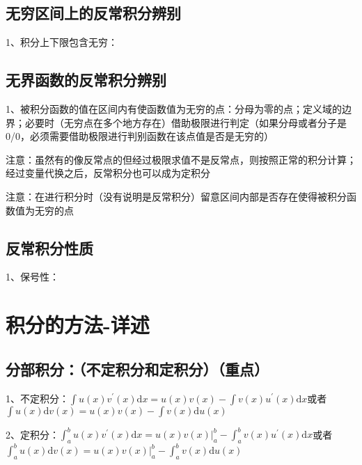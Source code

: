 \subsection{无穷区间上的反常积分辨别}

1、积分上下限包含无穷：



\subsection{无界函数的反常积分辨别}

1、被积分函数的值在区间内有使函数值为无穷的点：分母为零的点；定义域的边界；必要时（无穷点在多个地方存在）借助极限进行判定（如果分母或者分子是0/0，必须需要借助极限进行判别函数在该点值是否是无穷的）

注意：虽然有的像反常点的但经过极限求值不是反常点，则按照正常的积分计算；经过变量代换之后，反常积分也可以成为定积分

注意：在进行积分时（没有说明是反常积分）留意区间内部是否存在使得被积分函数值为无穷的点



\subsection{反常积分性质}

1、保号性：

\section{积分的方法-详述}



\subsection{分部积分：（不定积分和定积分）（重点）}

1、不定积分：$ \int u(x) v^{\prime}(x) \mathrm{d} x=u(x) v(x)-\int v(x) u^{\prime}(x) \mathrm{d} x $或者$ \int u(x) \mathrm{d} v(x)=u(x) v(x)-\int v(x) \mathrm{d} u(x) $

2、定积分：$ \int_{a}^{b} u(x) v^{\prime}(x) \mathrm{d} x=\left.u(x) v(x)\right|_{a} ^{b}-\int_{a}^{b} v(x) u^{\prime}(x) \mathrm{d} x $或者$ \int_{a}^{b} u(x) \mathrm{d} v(x)=\left.u(x) v(x)\right|_{a} ^{b}-\int_{a}^{b} v(x) \mathrm{d} u(x) $



